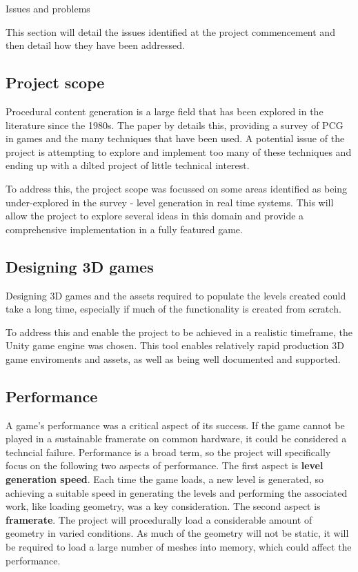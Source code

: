 \documentclass[progress]{cmpreport}
\begin{document}
\begin{section}{Issues and problems}

This section will detail the issues identified at the project commencement and then detail how they have been addressed.

\subsection{Project scope}
Procedural content generation is a large field that has been explored in the literature since the 1980s. The paper by \cite{Hendrikx:2013:PCG:2422956.2422957} details this, providing a survey of PCG in games and the many techniques that have been used. A potential issue of the project is attempting to explore and implement too many of these techniques and ending up with a dilted project of little technical interest. 

To address this, the project scope was focussed on some areas identified as being under-explored in the survey - level generation in real time systems. This will allow the project to explore several ideas in this domain and provide a comprehensive implementation in a fully featured game.

\subsection{Designing 3D games}
Designing 3D games and the assets required to populate the levels created could take a long time, especially if much of the functionality is created from scratch. 

To address this and enable the project to be achieved in a realistic timeframe, the Unity game engine was chosen. This tool enables relatively rapid production 3D game enviroments and assets, as well as being well documented and supported.

\subsection{Performance}
A game's performance was a critical aspect of its success. If the game cannot be played in a sustainable framerate on common hardware, it could be considered a techncial failure. Performance is a broad term, so the project will specifically focus on the following two aspects of performance. The first aspect is \textbf{level generation speed}. Each time the game loads, a new level is generated, so achieving a suitable speed in generating the levels and performing the associated work, like loading geometry, was a key consideration. The second aspect is \textbf{framerate}. The project will procedurally load a considerable amount of geometry in varied conditions. As much of the geometry will not be static, it will be required to load a large number of meshes into memory, which could affect the performance.  


\end{section}
\end{document}
